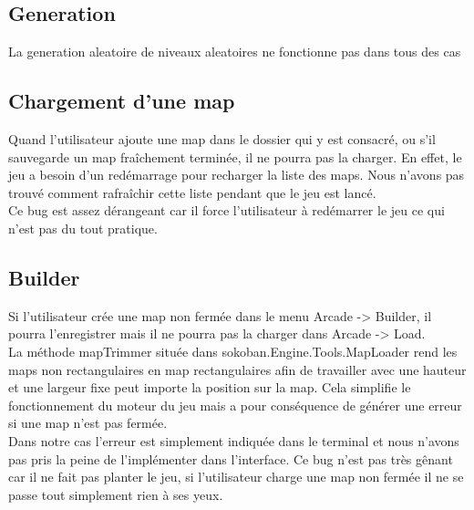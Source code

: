 \documentclass[../main.tex]{subfiles}
\begin{document}
\subsection{Generation}
La generation aleatoire de niveaux aleatoires ne fonctionne pas dans tous des cas

\subsection{Chargement d'une map}
Quand l’utilisateur ajoute une map dans le dossier qui y est consacré, ou s'il sauvegarde un map fraîchement terminée, il ne pourra pas la charger.
En effet, le jeu a besoin d’un redémarrage pour recharger la liste des maps. Nous n’avons pas trouvé comment rafraîchir cette liste pendant que le jeu est lancé. \\ 

Ce bug est assez dérangeant car il force l’utilisateur à redémarrer le jeu ce qui n’est pas du tout pratique.

\subsection{Builder}
Si l’utilisateur crée une map non fermée dans le menu Arcade -> Builder, il pourra l’enregistrer mais il ne pourra pas la charger dans Arcade -> Load. \\
La méthode mapTrimmer située dans sokoban.Engine.Tools.MapLoader rend les maps non rectangulaires en map rectangulaires afin de travailler avec une hauteur et une largeur fixe peut importe la position sur la map. Cela simplifie le fonctionnement du moteur du jeu mais a pour conséquence de générer une erreur si une map n’est pas fermée. \\

Dans notre cas l’erreur est simplement indiquée dans le terminal et nous n’avons pas pris la peine de l'implémenter dans l’interface. Ce bug n’est pas très gênant car il ne fait pas planter le jeu, si l’utilisateur charge une map non fermée il ne se passe tout simplement rien à ses yeux.
\end{document}
